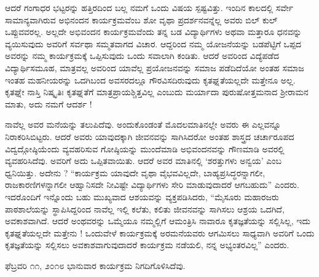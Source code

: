 {ಆದರೆ ಗಂಗಾಧರ ಭಟ್ಟರನ್ನು ಹತ್ತಿರದಿಂದ ಬಲ್ಲ ನಮಗೆ ಒಂದು ವಿಷಯ ಸ್ಪಷ್ಟವಿತ್ತು. ಇಂದಿನ ಕಾಲದಲ್ಲಿ ಸರ್ವೇ ಸಾಮಾನ್ಯವಾಗಿರುವ ಅಭಿನಂದನ ಕಾರ್ಯಕ್ರಮವೆಂಬ ಶೋ \enginline{-} ವೃಥಾ ಪ್ರದರ್ಶನವನ್ನೆಲ್ಲ ಅವರು ಬಿಲ್ ಕುಲ್ ಒಪ್ಪುವವರಲ್ಲ. ಅಲ್ಲದೇ ಅಭಿವಂದನ ಕಾರ್ಯಕ್ರಮವೆಂದು ತನ್ನ ಬಡ ವಿದ್ಯಾರ್ಥಿಗಳು ಅಥವಾ ಮತ್ತಾರೂ ಧನವನ್ನು ವ್ಯಯಿಸುವುದು ಅವರಿಗೆ ಸರ್ವಥಾ ಸಮ್ಮತವಾಗದ ವಿಚಾರ. ಆದ್ದರಿಂದ ನಮ್ಮ ಯೋಜನೆಯನ್ನು ಬಡಪೆಟ್ಟಿಗೆ ಒಪ್ಪದ  ಅವರನ್ನು ನಮ್ಮ ಕಾರ್ಯಕ್ರಮಕ್ಕೆ ಒಪ್ಪಿಸುವುದು ಒಂದು ಸವಾಲಾಗಿ ಕಂಡಿತು. ಆದರೆ ಅವರಿಂದ ವಿದ್ಯೆಪಡೆದ ವಿದ್ಯಾರ್ಥಿಸಮೂಹ, ಮಾತ್ರವಲ್ಲ  ಅವರಿಂದ ಯಾವೆಲ್ಲ ಪ್ರಯೋಜನವನ್ನು ಸಮಾಜ ಪಡೆದಿದೆಯೋ ಅಂತಹ ಸಮಾಜ ಇಂತಹ ಮಹನೀಯರನ್ನು ಒದಗಿಬಂದ ಅವಸರದಲ್ಲೂ  ಗೌರವಿಸದಿರುವುದು ಕೃತಘ್ನತೆಯಲ್ಲದೇ ಮತ್ತೇನೂ ಅಲ್ಲ. ಕೃತಘ್ನೇ ನಾಸ್ತಿ ನಿಷ್ಕೃತಿಃ \enginline{-} ಕೃತಘ್ನತೆಗೆ ಮಾತ್ರ\break ಪ್ರಾಯಶ್ಚಿತ್ತವಿಲ್ಲ ಎಂಬುದು ಮರ್ಯಾದಾ ಪುರುಷೋತ್ತಮನಾದ ಶ್ರೀರಾಮನ ಮಾತು, ಅದು ನಮಗೆ ಆದರ್ಶ ! 

ನಾವೆಲ್ಲ ಅವರ ಮನೆಯನ್ನು ತಲುಪಿದೆವು. ಅಂದುಕೊಂಡಂತೆ ಮೊದಲಮಾತಿನಲ್ಲೇ ಅವರು ಈ ಎಲ್ಲವನ್ನೂ ನಿರಾಕರಿಸಿಬಿಟ್ಟರು. ಆದರೆ ಅವರು ಯಾವುದಕ್ಕಾಗಿ ಜೀವನವನ್ನು ಸಾಗಿಸಿದರೋ ಅಂತಹ ಶಾಸ್ತ್ರದ ಚರ್ಚಾರೂಪದ \enginline{-} \hbox{ವಿದ್ವದ್ಗೋಷ್ಠಿಯೆಂದು} ವ್ಯವಹರಿಸುವ ಗೋಷ್ಠಿಯನ್ನು ಮುಂದೆಮಾಡಿ ಅಭಿವಂದನವನ್ನು ಗೌಣಮಾಡಿ ಅವರಲ್ಲಿ ವ್ಯವಹರಿಸಿದೆವು. ಅವರಿಗೆ ಅದು ಒಪ್ಪಿತವಾಯಿತು. ಆದರೆ ಅವರ ಮಾತಿನಲ್ಲಿ ‘ಶರತ್ತು\-ಗಳು ಅನ್ವಯ’ ಎಂಬ ಧ್ವನಿಯಿತ್ತು. ಅದೇನು ? \enginline{-} “ಕಾರ್ಯಕ್ರಮ ಯಾವುದೇ ವೃಥಾ ವೈಭವ\-ವಿಲ್ಲದೇ, ಬಾಹ್ಯಪ್ರಸಿದ್ಧರನ್ನಾಗಲೀ, ರಾಜಕಾರಣಿಗಳನ್ನಾಗಲೀ ಆಹ್ವಾನಿಸದೇ ನೀವಿಷ್ಟೇ ವಿದ್ಯಾರ್ಥಿಗಳು ಸೇರಿ ಮಾಡುವುದಾದರೆ ಆಗಬಹುದು” ಎಂದರು. ಇದರೊಂದಿಗೆ ಇನ್ನೊಂದು ಬಹು ಮುಖ್ಯವಾದ ಆಶಯವನ್ನು ವ್ಯಕ್ತಪಡಿಸಿದರು, \enginline{-} “ಮೈಸೂರು ಮಹಾರಜರು ಪಾಠಶಾಲೆಯನ್ನು ಸ್ಥಾಪಿಸಿದ್ದರಿಂದ ನಾವೆಲ್ಲ ಇಲ್ಲಿ \hbox{ಕಲೆತು}, ಕಲಿತು ಜೀವನವನ್ನು ಸಾಗಿಸಲು ಆಶ್ರಯ ಒದಗಿದೆ, ಅವಕಾಶವಾಗಿದೆ. ಆದರೆ ಅಂಥವರನ್ನು ಒಮ್ಮೆಯೂ ನಮ್ಮಲ್ಲಿಗೆ ಆಮಂತ್ರಿಸಿ ನಾವಾರೂ ಕೃತಜ್ಞತೆಯನ್ನು ಸಲ್ಲಿಸಿಲ್ಲ, ಇದು ಕೃತಘ್ನತೆಯಲ್ಲದೇ ಮತ್ತೇನು ! ಒಂದುವೇಳೆ ಕಾರ್ಯಕ್ರಮಕ್ಕೆ ಅರಮನೆಯವರು ಆಗಮಿಸಲು ಸಾಧ್ಯವಾಗಿ ಅವರಿಗೆ ಒಂದು ಕೃತಜ್ಞತೆಯನ್ನು ಸಲ್ಲಿಸಲು ಅವಕಾಶವಾಗುವು\-ದಾದರೆ ಕಾರ್ಯಕ್ರಮ ನಡೆಯಲಿ, ನನ್ನ ಅಭ್ಯಂತರವಿಲ್ಲ” ಎಂದರು. 

ಫೆಬ್ರವರಿ ೧೧, ೨೦೧೮ \enginline{-} ಭಾನುವಾರ ಕಾರ್ಯಕ್ರಮ ನಿಗದಿಗೊಳಿಸಿದೆವು.

}
